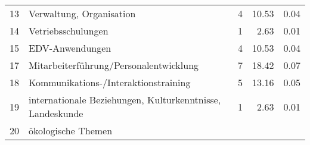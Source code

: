 \begin{longtable}{lXrrr}
     13 &
     \multicolumn{1}{X}{ Verwaltung, Organisation   } &


       \num{4} &
       \num[round-mode=places,round-precision=2]{10.53} &
         \num[round-mode=places,round-precision=2]{0.04} \\

     14 &
     \multicolumn{1}{X}{ Vetriebsschulungen   } &


       \num{1} &
       \num[round-mode=places,round-precision=2]{2.63} &
         \num[round-mode=places,round-precision=2]{0.01} \\

     15 &
     \multicolumn{1}{X}{ EDV-Anwendungen   } &


       \num{4} &
       \num[round-mode=places,round-precision=2]{10.53} &
         \num[round-mode=places,round-precision=2]{0.04} \\

     17 &
     \multicolumn{1}{X}{ Mitarbeiterführung/Personalentwicklung   } &


       \num{7} &
       \num[round-mode=places,round-precision=2]{18.42} &
         \num[round-mode=places,round-precision=2]{0.07} \\

     18 &
     \multicolumn{1}{X}{ Kommunikations-/Interaktionstraining   } &


       \num{5} &
       \num[round-mode=places,round-precision=2]{13.16} &
         \num[round-mode=places,round-precision=2]{0.05} \\

     19 &
     \multicolumn{1}{X}{ internationale Beziehungen, Kulturkenntnisse, Landeskunde   } &


       \num{1} &
       \num[round-mode=places,round-precision=2]{2.63} &
         \num[round-mode=places,round-precision=2]{0.01} \\

     20 &
     \multicolumn{1}{X}{ ökologische Themen   } &



\end{longtable}
